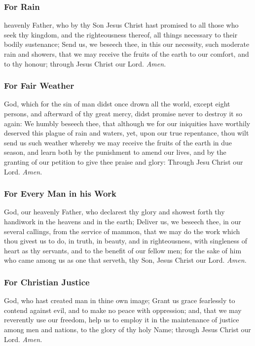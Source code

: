 \subsubsection{For Rain}
 heavenly Father, who by thy Son Jesus Christ hast promised to all those who seek thy kingdom, and the righteousness thereof, all things necessary to their bodily sustenance; Send us, we beseech thee, in this our necessity, such moderate rain and showers, that we may receive the fruits of the earth to our comfort, and to thy honour; through Jesus Christ our Lord. \textit{Amen.}

\subsubsection{For Fair Weather}
 God, which for the sin of man didst once drown all the world, except eight persons, and afterward of thy great mercy, didst promise never to destroy it so again: We humbly beseech thee, that although we for our iniquities have worthily deserved this plague of rain and waters, yet, upon our true repentance, thou wilt send us such weather whereby we may receive the fruits of the earth in due season, and learn both by the punishment to amend our lives, and by the granting of our petition to give thee praise and glory: Through Jesu Christ our Lord. \textit{Amen.}

\subsubsection{For Every Man in his Work}
 God, our heavenly Father, who declarest thy glory and showest forth thy handiwork in the heavens and in the earth; Deliver us, we beseech thee, in our several callings, from the service of mammon, that we may do the work which thou givest us to do, in truth, in beauty, and in righteousness, with singleness of heart as thy servants, and to the benefit of our fellow men; for the sake of him who came among us as one that serveth, thy Son, Jesus Christ our Lord. \textit{Amen.}

\subsubsection{For Christian Justice}
 God, who hast created man in thine own image; Grant us grace fearlessly to contend against evil, and to make no peace with oppression; and, that we may reverently use our freedom, help us to employ it in the maintenance of justice among men and nations, to the glory of thy holy Name; through Jesus Christ our Lord. \textit{Amen.}


